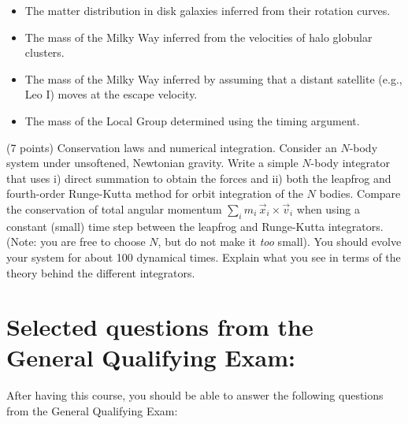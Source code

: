 \documentclass[12pt]{article}
\begin{document}
\begin{itemize}
\item The matter distribution in disk galaxies inferred from their
  rotation curves.
\item The mass of the Milky Way inferred from the velocities of halo globular clusters.
\item The mass of the Milky Way inferred by assuming that a distant satellite (e.g., Leo I) moves at the escape velocity.
\item The mass of the Local Group determined using the timing
  argument.
\end{itemize}


 (7 points) Conservation laws and numerical
integration. Consider an $N$-body system under unsoftened, Newtonian
gravity. Write a simple $N$-body integrator that uses i) direct
summation to obtain the forces and ii) both the leapfrog and
fourth-order Runge-Kutta method for orbit integration of the $N$
bodies. Compare the conservation of total angular momentum $\sum_i
m_i\,\vec{x}_i\times\vec{v}_i$ when using a constant (small) time step
between the leapfrog and Runge-Kutta integrators. (Note: you are free
to choose $N$, but do not make it \emph{too} small). You should evolve
your system for about 100 dynamical times. Explain what you see in
terms of the theory behind the different integrators.

\newpage

\section*{Selected questions from the General Qualifying Exam:}

After having this course, you should be able to answer the following
questions from the General Qualifying Exam:
\end{document}

